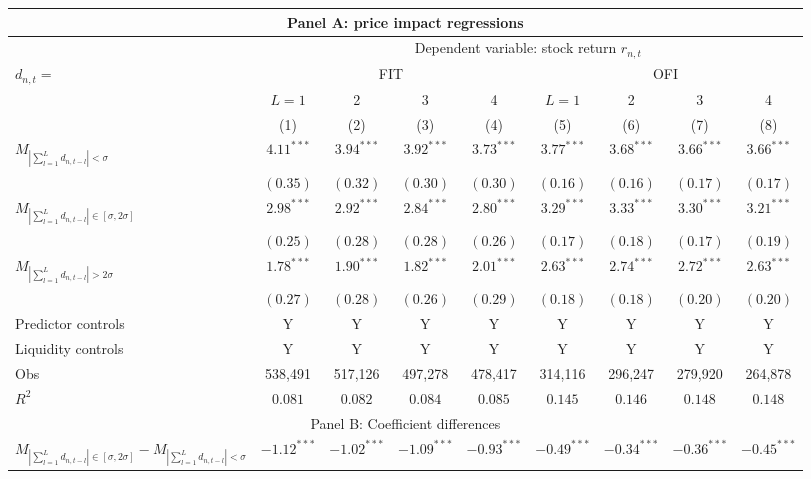 \begin{tabular}{lcccccccc}
  \hline \multicolumn{9}{c}{Panel A: price impact regressions} \\
 \hline 
    & \multicolumn{8}{c}{Dependent variable: stock return $r_{n,t}$} \\

    \cmidrule(l){2-9} $d_{n,t} = $ & \multicolumn{4}{c}{FIT} & \multicolumn{4}{c}{OFI} \\
 \cmidrule(l){2-5} \cmidrule(l){6-9} 
  & $L=1$ & 2 & 3 & 4 & $L=1$ & 2 & 3 & 4 \\ 
   \cmidrule(l){2-5} \cmidrule(l){6-9} \vspace{5pt} & (1) & (2) & (3) & (4) & (5) & (6) & (7) & (8) \\ 
  $M_{\left|\sum_{l=1}^L d_{n,t-l}\right| < \sigma}$ & $4.11^{***}$ & $3.94^{***}$ & $3.92^{***}$ & $3.73^{***}$ & $3.77^{***}$ & $3.68^{***}$ & $3.66^{***}$ & $3.66^{***}$ \\ 
   & $(0.35)$ & $(0.32)$ & $(0.30)$ & $(0.30)$ & $(0.16)$ & $(0.16)$ & $(0.17)$ & $(0.17)$ \\ 
  $M_{\left|\sum_{l=1}^L d_{n,t-l}\right| \in [\sigma, 2\sigma]}$ & $2.98^{***}$ & $2.92^{***}$ & $2.84^{***}$ & $2.80^{***}$ & $3.29^{***}$ & $3.33^{***}$ & $3.30^{***}$ & $3.21^{***}$ \\ 
   & $(0.25)$ & $(0.28)$ & $(0.28)$ & $(0.26)$ & $(0.17)$ & $(0.18)$ & $(0.17)$ & $(0.19)$ \\ 
  $M_{\left|\sum_{l=1}^L d_{n,t-l}\right| > 2 \sigma}$ & $1.78^{***}$ & $1.90^{***}$ & $1.82^{***}$ & $2.01^{***}$ & $2.63^{***}$ & $2.74^{***}$ & $2.72^{***}$ & $2.63^{***}$ \\ 
   \vspace{5pt} & $(0.27)$ & $(0.28)$ & $(0.26)$ & $(0.29)$ & $(0.18)$ & $(0.18)$ & $(0.20)$ & $(0.20)$ \\ 
  Predictor controls & Y & Y & Y & Y & Y & Y & Y & Y \\ 
   \vspace{5pt}Liquidity controls & Y & Y & Y & Y & Y & Y & Y & Y \\ 
  Obs & 538,491 & 517,126 & 497,278 & 478,417 & 314,116 & 296,247 & 279,920 & 264,878 \\ 
  $R^2$ & $0.081$ & $0.082$ & $0.084$ & $0.085$ & $0.145$ & $0.146$ & $0.148$ & $0.148$ \\ 
   \hline \multicolumn{9}{c}{Panel B: Coefficient differences} \\
 \hline$M_{\left|\sum_{l=1}^L d_{n,t-l}\right| \in [\sigma, 2\sigma]}-M_{\left|\sum_{l=1}^L d_{n,t-l}\right| < \sigma}$ & $-1.12^{***}$ & $-1.02^{***}$ & $-1.09^{***}$ & $-0.93^{***}$ & $-0.49^{***}$ & $-0.34^{***}$ & $-0.36^{***}$ & $-0.45^{***}$ \\ 

\end{tabular}
